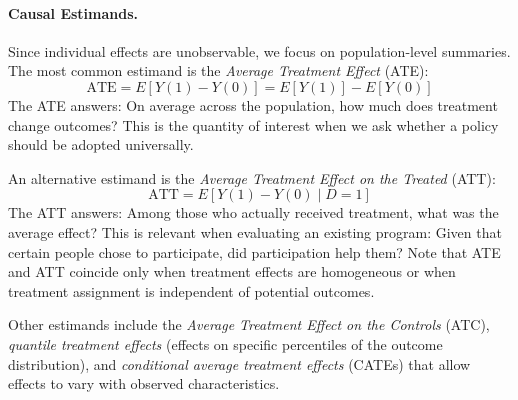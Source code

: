 \paragraph{Causal Estimands.}
Since individual effects are unobservable, we focus on population-level summaries.
The most common estimand is the \emph{Average Treatment Effect} (ATE):
\begin{equation}
    \text{ATE} = E[Y(1) - Y(0)] = E[Y(1)] - E[Y(0)]
\end{equation}
The ATE answers: On average across the population, how much does treatment change outcomes?
This is the quantity of interest when we ask whether a policy should be adopted universally.

An alternative estimand is the \emph{Average Treatment Effect on the Treated} (ATT):
\begin{equation}
    \text{ATT} = E[Y(1) - Y(0) \mid D = 1]
\end{equation}
The ATT answers: Among those who actually received treatment, what was the average effect?
This is relevant when evaluating an existing program: Given that certain people chose to participate, did participation help them?
Note that ATE and ATT coincide only when treatment effects are homogeneous or when treatment assignment is independent of potential outcomes.

Other estimands include the \emph{Average Treatment Effect on the Controls} (ATC), \emph{quantile treatment effects} (effects on specific percentiles of the outcome distribution), and \emph{conditional average treatment effects} (CATEs) that allow effects to vary with observed characteristics.

